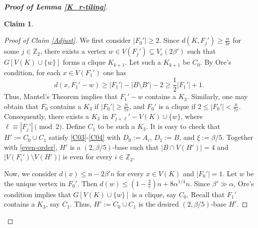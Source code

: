 \documentclass[11pt, a4paper]{article}
\newtheorem{claim}[theorem]{Claim}
\theoremstyle{definition}
\newcommand{\<}{\subseteq}
\begin{document}
\begin{proof}[\bf Proof of Lemma \ref{K_r-tiling}]
\begin{claim}
\end{claim}
\begin{proof}[Proof of Claim \ref{Adjust}]
We first consider $|F_0'|\geq 2$. Since $d(K,F_j')\ge \frac{n}{3r}$ for some $j\in \mathbb{Z}_2$, there exists a vertex $w\in V(F_j')\subseteq V_{e}(2\beta')$ such that $G[V(K)\cup \{w\}]$ forms a clique $K_{k+1}$. Let such a $K_{k+1}$ be $C_0$. %
By Ore's condition, for each $x\in V(F_1')$ one has 
$$d(x,F_1'-w)\ge |F_1'|-|B\setminus B'|-2\ge \frac{1}{2}|F_1'|+1.$$
Thus, Mantel's Theorem implies that $F_1'-w$ contains a $K_3$. Similarly, one may  obtain that $F_0$ contains a $K_3$ if $|F_0'|\geq \frac{n}{7r}$, and $F_0'$ is a clique if $2\le |F_0'|< \frac{n}{7r}$. %
Consequently, there exists a  $K_3$ in $F_{j+\ell}'-V(K)\cup \{w\}$, where $\ell\equiv |F_j'|\pmod{2}$. Define $C_1$ to be such a $K_3$. It is easy to check that $H':=C_0\cup C_1$ satisfy \ref{C03}-\ref{C04} with $D_0:=A_i$, $D_1:=B$, and $\xi:=\beta/5$. Together with \eqref{even-order}, $H'$ is a $(2,\beta/5)$-base such that $|B\cap V(H')|=4$ and $|V(F_i')\setminus V(H')|$ is even for every $i\in \mathbb{Z}_2$.   %

Now, we consider  $d(x)\le n-2\beta'n$ for every $x\in V(K)$ and $|F_0'|=1$. Let $w$ be the unique vertex in $F_0'$. Then $d(w)\le (1-\frac{2}{r})n+8\alpha^{1/4}n$. Since $\beta' \gg \alpha$, Ore's condition implies that $G[V(K)\cup \{w\}]$ is a clique, say $C_0$.  Recall that $F_1'$ contains a $K_3$, say $C_1$. %
Thus, $H':=C_0\cup C_1$ is the desired $(2,\beta/5)$-base $H'$.
\end{proof}


\end{proof}
\end{document}
